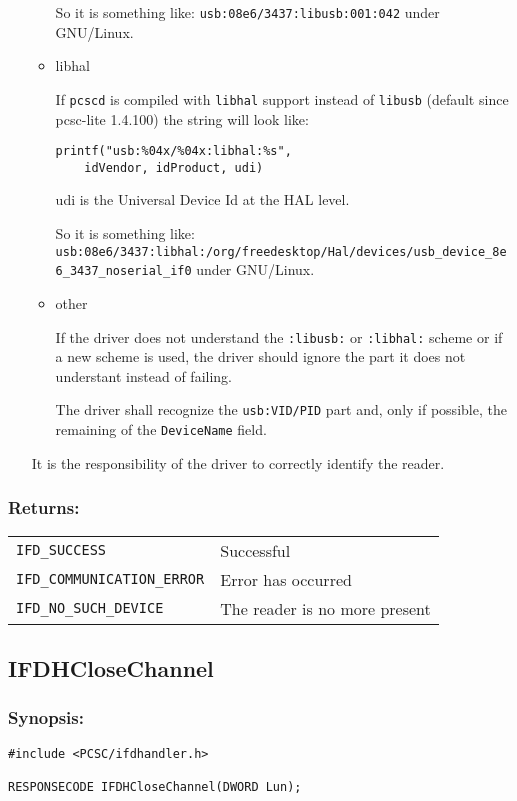 \documentclass[a4paper,12pt]{article}
\newcommand{\synopsis}{\subsubsection{Synopsis:}}
\newcommand{\returns}{\subsubsection{Returns:}}
\begin{document}
\begin{itemize}
\begin{itemize}
So it is something like: \texttt{usb:08e6/3437:libusb:001:042} under
GNU/Linux.

\item libhal

If \texttt{pcscd} is compiled with \texttt{libhal} support instead of
\texttt{libusb} (default since pcsc-lite 1.4.100)
the string will look like:
\begin{verbatim}
printf("usb:%04x/%04x:libhal:%s",
    idVendor, idProduct, udi)
\end{verbatim}

udi is the Universal Device Id at the HAL level.

So it is something like: \texttt{
usb:08e6/3437:libhal:/org/freedesktop/Hal/devices/usb\_device\_8e6\_3437\_noserial\_if0}
under GNU/Linux.

\item other

If the driver does not understand the \texttt{:libusb:} or
\texttt{:libhal:} scheme or if a new scheme is used, the driver should
ignore the part it does not understant instead of failing.

The driver shall recognize the \texttt{usb:VID/PID} part and, only if
possible, the remaining of the \texttt{DeviceName} field.

\end{itemize}

It is the responsibility of the driver to correctly identify the reader.

\end{itemize}

\returns

\begin{tabular}{ll}
\texttt{IFD\_SUCCESS} & Successful\\
\texttt{IFD\_COMMUNICATION\_ERROR} & Error has occurred\\
\texttt{IFD\_NO\_SUCH\_DEVICE} & The reader is no more present\\
\end{tabular}


\subsection{IFDHCloseChannel}

\synopsis
\begin{verbatim}
#include <PCSC/ifdhandler.h>

RESPONSECODE IFDHCloseChannel(DWORD Lun);
\end{verbatim}
\end{document}
